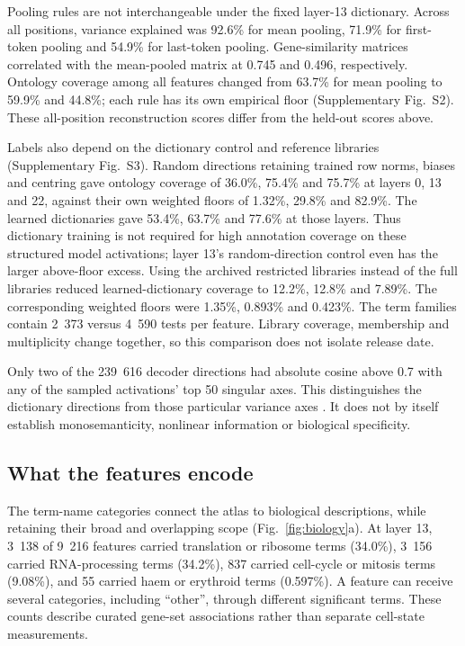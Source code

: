 \documentclass[review,authoryear,12pt]{elsarticle}
\begin{document}
Pooling rules are not interchangeable under the fixed layer-13 dictionary. Across all positions,
variance explained was 92.6\% for mean pooling, 71.9\% for first-token pooling and 54.9\% for
last-token pooling. Gene-similarity matrices correlated with the mean-pooled matrix at 0.745 and
0.496, respectively. Ontology coverage among all features changed from 63.7\% for mean pooling
to 59.9\% and 44.8\%; each rule has its own empirical floor (Supplementary Fig.~S2).
These all-position reconstruction scores differ from the held-out scores above.

Labels also depend on the dictionary control and reference libraries (Supplementary Fig.~S3).
Random directions retaining trained row norms, biases and centring gave ontology coverage of
36.0\%, 75.4\% and 75.7\% at layers 0, 13 and 22, against their own weighted floors of 1.32\%,
29.8\% and 82.9\%. The learned dictionaries gave 53.4\%, 63.7\% and 77.6\% at those layers.
Thus dictionary training is not required for high annotation coverage on these structured model
activations; layer 13's random-direction control even has the larger above-floor excess.
Using the archived restricted libraries instead of the full libraries reduced learned-dictionary
coverage to 12.2\%, 12.8\% and 7.89\%. The corresponding weighted floors were 1.35\%, 0.893\%
and 0.423\%. The term families contain 2~373 versus 4~590 tests per feature. Library coverage,
membership and multiplicity change together, so this comparison does not isolate release date.

Only two of the 239~616 decoder directions had absolute cosine above 0.7 with any of the sampled
activations' top 50 singular axes. This distinguishes the dictionary directions from those
particular variance axes \citep{ref7,ref21}. It does not by itself establish monosemanticity,
nonlinear information or biological specificity.

\subsection{What the features encode}

The term-name categories connect the atlas to biological descriptions, while retaining their broad
and overlapping scope (Fig.~\ref{fig:biology}a). At layer 13, 3~138 of 9~216 features carried
translation or ribosome terms (34.0\%), 3~156 carried RNA-processing terms (34.2\%), 837 carried
cell-cycle or mitosis terms (9.08\%), and 55 carried haem or erythroid terms (0.597\%). A feature
can receive several categories, including ``other'', through different significant terms.
These counts describe curated gene-set associations rather than separate cell-state measurements.
\end{document}
